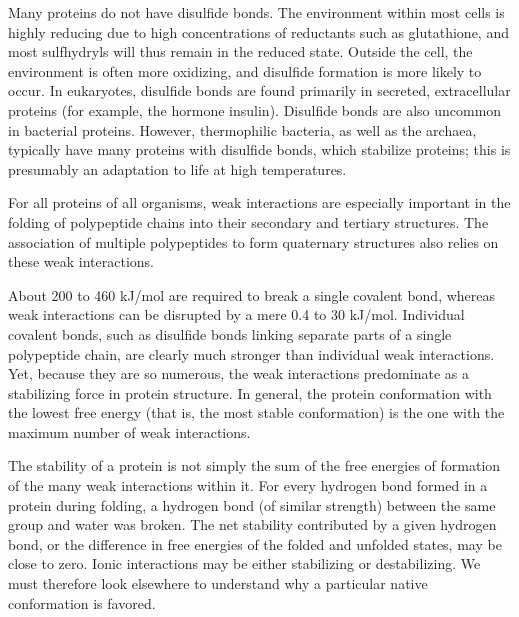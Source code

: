 Many proteins do not have disulfide bonds. The environment within most cells is highly reducing due to high concentrations of reductants such as glutathione, and most sulfhydryls will thus remain in the reduced state. Outside the cell, the environment is often more oxidizing, and disulfide formation is more likely to occur. In eukaryotes, disulfide bonds are found primarily in secreted, extracellular proteins (for example, the hormone insulin). Disulfide bonds are also uncommon in bacterial proteins. However, thermophilic bacteria, as well as the archaea, typically have many proteins with disulfide bonds, which stabilize proteins; this is presumably an adaptation to life at high temperatures. 

For all proteins of all organisms, weak interactions are especially important in the folding of polypeptide chains into their secondary and tertiary structures. The association of multiple polypeptides to form quaternary structures also relies on these weak interactions. 

About 200 to 460 kJ/mol are required to break a single covalent bond, whereas weak interactions can be disrupted by a mere 0.4 to 30 kJ/mol. Individual covalent bonds, such as disulfide bonds linking separate parts of a single polypeptide chain, are clearly much stronger than individual weak interactions. 
Yet, because they are so numerous, the weak interactions predominate as a stabilizing force in protein structure. In general, the protein conformation with the lowest free energy (that is, the most stable conformation) is the one with the maximum number of weak interactions. 

The stability of a protein is not simply the sum of the free energies of formation of the many weak interactions within it. For every hydrogen bond formed in a protein during folding, a hydrogen bond (of similar strength) between the same group and water was broken. The net stability contributed by a given hydrogen bond, or the difference in free energies of the folded and unfolded states, may be close to zero. Ionic interactions may be either stabilizing or destabilizing. We must therefore look elsewhere to understand why a particular native conformation is favored. 

